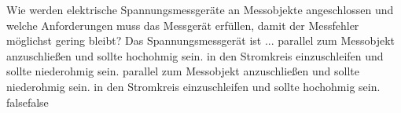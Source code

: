     {Wie werden elektrische Spannungsmessgeräte an Messobjekte angeschlossen und welche Anforderungen muss das Messgerät erfüllen, damit der Messfehler möglichst gering bleibt? Das Spannungsmessgerät ist ...}
    {parallel zum Messobjekt anzuschließen und sollte hochohmig sein.}
    {in den Stromkreis einzuschleifen und sollte niederohmig sein.}
    {parallel zum Messobjekt anzuschließen und sollte niederohmig sein.}
    {in den Stromkreis einzuschleifen und sollte hochohmig sein.}
    {false}{false}